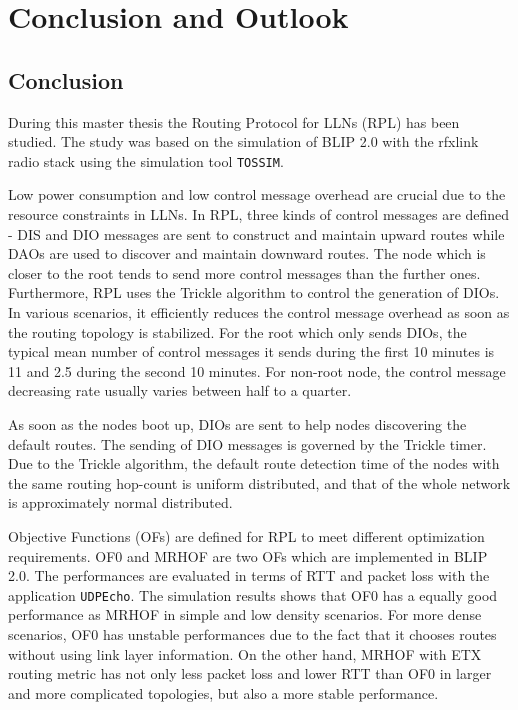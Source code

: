 \chapter{Conclusion and Outlook}
\label{Con}
\section{Conclusion} 
\label{Con:Con}

During this master thesis the Routing Protocol for LLNs (RPL) has been studied. The study was based on the simulation of BLIP 2.0 with the rfxlink radio stack using the simulation tool \texttt{TOSSIM}. 

Low power consumption and low control message overhead are crucial due to the resource constraints in LLNs. In RPL, three kinds of control messages are defined - DIS and DIO messages are sent to construct and maintain upward routes while DAOs are used to discover and maintain downward routes. The node which is closer to the root tends to send more control messages than the further ones. Furthermore, RPL uses the Trickle algorithm to control the generation of DIOs. In various scenarios, it efficiently reduces the control message overhead as soon as the routing topology is stabilized. For the root which only sends DIOs, the typical mean number of control messages it sends during the first 10 minutes is 11 and 2.5 during the second 10 minutes. For non-root node, the control message decreasing rate usually varies between half to a quarter.

As soon as the nodes boot up, DIOs are sent to help nodes discovering the default routes. The sending of DIO messages is governed by the Trickle timer. Due to the Trickle algorithm, the default route detection time of the nodes with the same routing hop-count is uniform distributed, and that of the whole network is approximately normal distributed. 
 
Objective Functions (OFs) are defined for RPL to meet different optimization requirements. OF0 and MRHOF are two OFs which are implemented in BLIP 2.0. The performances are evaluated in terms of RTT and packet loss with the application \texttt{UDPEcho}\@. The simulation results shows that OF0 has a equally good performance as MRHOF in simple and low density scenarios. For more dense scenarios, OF0 has unstable performances due to the fact that it chooses routes without using link layer information. On the other hand, MRHOF with ETX routing metric has not only less packet loss and lower RTT than OF0 in larger and more complicated topologies, but also a more stable performance. 

